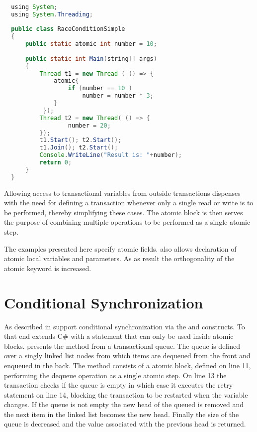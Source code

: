 \begin{lstlisting}[label=lst:stm_atomic_syntax_simplified,
  caption={Transaction Syntax Simplified},
  language=Java,  
  showspaces=false,
  showtabs=false,
  breaklines=true,
  showstringspaces=false,
  breakatwhitespace=true,
  commentstyle=\color{greencomments},
  keywordstyle=\color{bluekeywords},
  stringstyle=\color{redstrings},
  morekeywords={atomic, retry, orElse, var, get, set, using}]  % Start your code-block

  using System;
  using System.Threading;
  
  public class RaceConditionSimple
  {
      public static atomic int number = 10;
  
      public static int Main(string[] args)
      {
          Thread t1 = new Thread ( () => {
              atomic{
                  if (number == 10 )           
                      number = number * 3;
              }
           });
          Thread t2 = new Thread( () => {
                  number = 20;
          });
          t1.Start(); t2.Start();
          t1.Join(); t2.Start();
          Console.WriteLine("Result is: "+number);
          return 0;
      }
  }
\end{lstlisting}
Allowing access to transactional variables from outside transactions dispenses with the need for defining a transaction whenever only a single read or write is to be performed, thereby simplifying these cases. The atomic block is then serves the purpose of combining multiple operations to be performed as a single atomic step.

The examples presented here specify atomic fields. \stmnamesp also allows declaration of atomic local variables and parameters. As as result the orthogonality of the atomic keyword is increased.

\section{Conditional Synchronization}
As described in  \stmnamesp support conditional synchronization via the  and  constructs. To that end \stmnamesp extends C\# with a  statement that can only be used inside atomic blocks.  presents the  method from a transactional queue. The queue is defined over a singly linked list nodes from which items are dequeued from the front and enqueued in the back. The  method consists of a atomic block, defined on line 11, performing the dequeue operation as a single atomic step. On line 13 the transaction checks if the queue is empty in which case it executes the retry statement on line 14, blocking the transaction to be restarted when the  variable changes. If the queue is not empty the new head of the queued is removed and the next item in the linked list becomes the new head. Finally the size of the queue is decreased and the value associated with the previous head is returned. 

